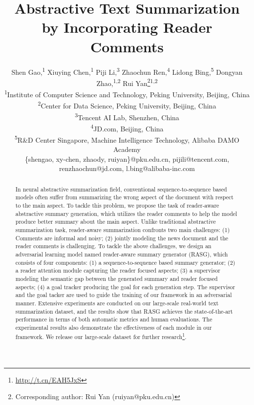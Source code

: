 \documentclass[letterpaper]{article}
\begin{document}
    \title{Abstractive Text Summarization by Incorporating Reader Comments}
    \author{Shen Gao,\textsuperscript{1}
    	Xiuying Chen,\textsuperscript{1}
    	Piji Li,\textsuperscript{3}
    	Zhaochun Ren,\textsuperscript{4}
    	Lidong Bing,\textsuperscript{5}
    	Dongyan Zhao,\textsuperscript{1,2}
    	Rui Yan\thanks{Corresponding author: Rui Yan (ruiyan@pku.edu.cn)}\textsuperscript{1,2}\\
    	\textsuperscript{1}{Institute of Computer Science and Technology, Peking University, Beijing, China} \\
    	\textsuperscript{2}{Center for Data Science, Peking University, Beijing, China}\\
    	\textsuperscript{3}{Tencent AI Lab, Shenzhen, China} \\
    	\textsuperscript{4}{JD.com, Beijing, China} \\
    	\textsuperscript{5}{R\&D Center Singapore, Machine Intelligence Technology, Alibaba DAMO Academy}\\
    	\{shengao, xy-chen, zhaody, ruiyan\}@pku.edu.cn,
    	pijili@tencent.com,
    	renzhaochun@jd.com,
    	l.bing@alibaba-inc.com}

    \maketitle
    \begin{abstract}
    In neural abstractive summarization field, conventional sequence-to-sequence based models often suffer from summarizing the wrong aspect of the document with respect to the main aspect.
    To tackle this problem, we propose the task of reader-aware abstractive summary generation, which utilizes the reader comments to help the model produce better summary about the main aspect.
    Unlike traditional abstractive summarization task, reader-aware summarization confronts two main challenges: (1) Comments are informal and noisy;
    (2) jointly modeling the news document and the reader comments is challenging.
    To tackle the above challenges, we design an adversarial learning model named reader-aware summary generator (RASG), which consists of four components: (1) a sequence-to-sequence based summary generator; (2) a reader attention module capturing the reader focused aspects; (3) a supervisor modeling the semantic gap between the generated summary and reader focused aspects; (4) a goal tracker producing the goal for each generation step.
    The supervisor and the goal tacker are used to guide the training of our framework in an adversarial manner.
    Extensive experiments are conducted on our large-scale real-world text summarization dataset, and the results show that RASG achieves the state-of-the-art performance in terms of both automatic metrics and human evaluations. The experimental results also demonstrate the effectiveness of each module in our framework.
    We release our large-scale dataset for further research\footnote{\url{http://t.cn/EAH5JxS}}.
    \end{abstract}
\end{document}
